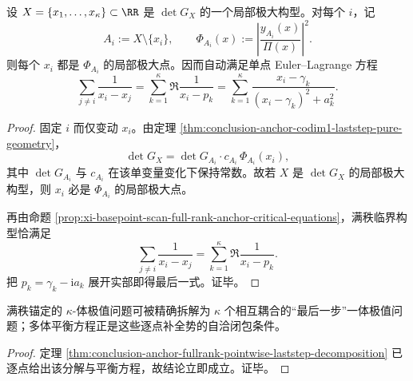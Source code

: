 \begin{theorem}[满秩极值的逐点最后一步分解]\label{thm:conclusion-anchor-fullrank-pointwise-laststep-decomposition}
设 \(X=\{x_1,\dots,x_\kappa\}\subset\RR\) 是 \(\det G_X\) 的一个局部极大构型。对每个 \(i\)，记
\[
A_i:=X\setminus\{x_i\},
\qquad
\Phi_{A_i}(x):=\left|\frac{y_{A_i}(x)}{\Pi(x)}\right|^2.
\]
则每个 \(x_i\) 都是 \(\Phi_{A_i}\) 的局部极大点。因而自动满足单点 Euler--Lagrange 方程
\[
\sum_{j\ne i}\frac{1}{x_i-x_j}
=
\sum_{k=1}^{\kappa}\Re\frac{1}{x_i-p_k}
=
\sum_{k=1}^{\kappa}\frac{x_i-\gamma_k}{(x_i-\gamma_k)^2+a_k^2}.
\]
\end{theorem}
\begin{proof}
固定 \(i\) 而仅变动 \(x_i\)。由定理 \ref{thm:conclusion-anchor-codim1-laststep-pure-geometry}，
\[
\det G_X
=
\det G_{A_i}\cdot c_{A_i}\,\Phi_{A_i}(x_i),
\]
其中 \(\det G_{A_i}\) 与 \(c_{A_i}\) 在该单变量变化下保持常数。故若 \(X\) 是 \(\det G_X\) 的局部极大构型，则 \(x_i\) 必是 \(\Phi_{A_i}\) 的局部极大点。

再由命题 \ref{prop:xi-basepoint-scan-full-rank-anchor-critical-equations}，满秩临界构型恰满足
\[
\sum_{j\ne i}\frac{1}{x_i-x_j}
=
\sum_{k=1}^{\kappa}\Re\frac{1}{x_i-p_k}.
\]
把 \(p_k=\gamma_k-\mathrm{i}a_k\) 展开实部即得最后一式。证毕。
\end{proof}

\begin{corollary}[多体平衡的逐点补全解释]\label{cor:conclusion-anchor-manybody-as-laststep-selfconsistency}
满秩锚定的 \(\kappa\)-体极值问题可被精确拆解为 \(\kappa\) 个相互耦合的“最后一步”一体极值问题；多体平衡方程正是这些逐点补全势的自洽闭包条件。
\end{corollary}
\begin{proof}
定理 \ref{thm:conclusion-anchor-fullrank-pointwise-laststep-decomposition} 已逐点给出该分解与平衡方程，故结论立即成立。证毕。
\end{proof}

